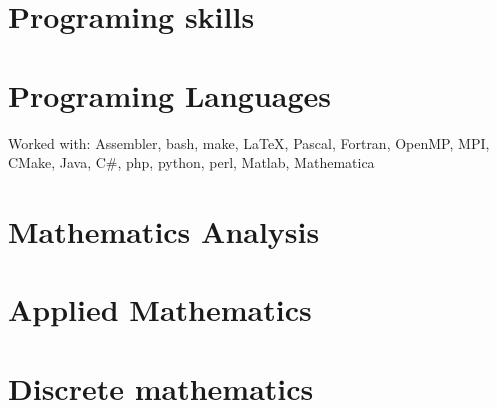\section*{Programing skills}
\section*{Programing Languages}
Worked with: Assembler, bash, make, \LaTeX, Pascal, Fortran, OpenMP, MPI, CMake, Java, C\#, php, python, perl, Matlab, Mathematica
\section*{Mathematics Analysis}
\section*{Applied Mathematics}
\section*{Discrete mathematics}
